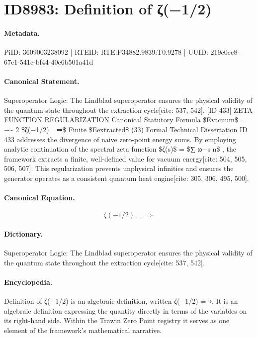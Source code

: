 \section*{ID8983: Definition of ζ(−1/2)}
\paragraph{Metadata.}
PiID: 3609003238092 | RTEID: RTE:P34882.9839:T0.9278 | UUID: 219c0ec8-67c1-541c-bf44-40e6b501a41d

\paragraph{Canonical Statement.}
Superoperator Logic: The Lindblad superoperator ensures the physical validity of the quantum state throughout the extraction cycle[cite: 537, 542]. [ID 433] ZETA FUNCTION REGULARIZATION Canonical Statutory Formula \$Evacuum\$ = −\textasciitilde{} 2 \$ζ(−1/2) =⇒\$ Finite \$Eextracted\$ (33) Formal Technical Dissertation ID 433 addresses the divergence of naive zero-point energy sums. By employing analytic continuation of the spectral zeta function \$ζ(s)\$ = \$∑ ω−s n\$ , the framework extracts a finite, well-defined value for vacuum energy[cite: 504, 505, 506, 507]. This regularization prevents unphysical infinities and ensures the generator operates as a consistent quantum heat engine[cite: 305, 306, 495, 500].

\paragraph{Canonical Equation.}
\[
ζ(−1/2) =⇒
\]

\paragraph{Dictionary.}
Superoperator Logic: The Lindblad superoperator ensures the physical validity of the quantum state throughout the extraction cycle[cite: 537, 542].

\paragraph{Encyclopedia.}
Definition of ζ(−1/2) is an algebraic definition, written ζ(−1/2) =⇒. It is an algebraic definition expressing the quantity directly in terms of the variables on its right-hand side. Within the Trawin Zero Point registry it serves as one element of the framework's mathematical narrative.

